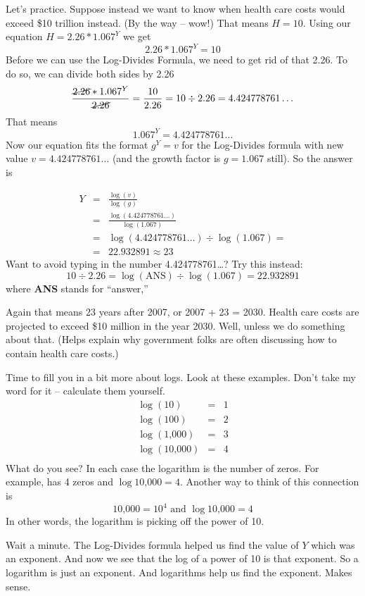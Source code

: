 Let's practice. Suppose instead we want to know when health care costs would exceed \$10 trillion instead.  (By the way -- wow!)  That means $H = 10$.  Using our equation $H=2.26\ast1.067^Y$ we get $$2.26\ast1.067^Y=10$$
Before we can use the Log-Divides Formula, we need to get rid of that 2.26.  To do so, we can divide both sides by 2.26
$$\frac{\cancel{2.26}\ast1.067^Y}{\cancel{2.26}}=\frac{10}{2.26}=10 \div 2.26 = 4.424778761\ldots$$ 
That means
$$1.067^Y=4.424778761\ldots$$
Now our equation fits the format $g^Y=v$ for the Log-Divides formula with new value $v=4.424778761\ldots$ (and the growth factor is $g=1.067$ still).  So the answer is 

\begin{eqnarray*}
Y & = &  \frac{\log (v)}{\log(g)}\\
& = &  \frac{\log (4.424778761\ldots)}{\log(1.067)}\\
& =  &  \log (4.424778761\ldots) \div \log (1.067) = \\
& =  &  22.932891 \approx 23 
\end{eqnarray*}
Want to avoid typing in the number 4.424778761\ldots? Try this instead:
$$10 \div 2.26 = \log(\text{ANS}) \div \log(1.067)= 22.932891$$
where \textbf{ANS} stands for ``answer,''

Again that means 23 years after 2007, or 2007 + 23 = 2030.  Health care costs are projected to exceed \$10 million in the year 2030.  Well, unless we do something about that.  (Helps explain why government folks are often discussing how to contain health care costs.)

Time to fill you in a bit more about logs.  Look at these examples.  Don't take my word for it -- calculate them yourself.
\begin{eqnarray*}
\log (10) & = & 1 \\
\log (100) & = & 2 \\
\log (\text{1,000}) & = & 3 \\
\log (\text{10,000}) & = & 4 \\
\end{eqnarray*}
What do you see?  In each case the logarithm is the number of zeros.  For example,  has 4 zeros and $\log \text{10,000}=4$.  Another way to think of this connection is $$ \text{10,000} = 10^4 \text{ and } \log \text{10,000}=4$$ In other words, the logarithm is picking off the power of 10.  

Wait a minute.  The Log-Divides formula helped us find the value of $Y$ which was an exponent.   And now we see that the log of a power of 10 is that exponent.  So a logarithm is just an exponent. And logarithms help us find the exponent.  Makes sense.

